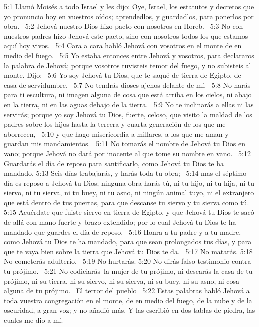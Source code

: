 5:1 Llamó Moisés a todo Israel y les dijo: Oye, Israel, los estatutos y decretos que yo pronuncio hoy en vuestros oídos; aprendedlos, y guardadlos, para ponerlos por obra.  
5:2 Jehová nuestro Dios hizo pacto con nosotros en Horeb.  
5:3 No con nuestros padres hizo Jehová este pacto, sino con nosotros todos los que estamos aquí hoy vivos.  
5:4 Cara a cara habló Jehová con vosotros en el monte de en medio del fuego.  
5:5 Yo estaba entonces entre Jehová y vosotros, para declararos la palabra de Jehová; porque vosotros tuvisteis temor del fuego, y no subisteis al monte. Dijo:  
5:6 Yo soy Jehová tu Dios, que te saqué de tierra de Egipto, de casa de servidumbre.  
5:7 No tendrás dioses ajenos delante de mí.  
5:8 No harás para ti escultura, ni imagen alguna de cosa que está arriba en los cielos, ni abajo en la tierra, ni en las aguas debajo de la tierra.  
5:9 No te inclinarás a ellas ni las servirás; porque yo soy Jehová tu Dios, fuerte, celoso, que visito la maldad de los padres sobre los hijos hasta la tercera y cuarta generación de los que me aborrecen,  
5:10 y que hago misericordia a millares, a los que me aman y guardan mis mandamientos.  
5:11 No tomarás el nombre de Jehová tu Dios en vano; porque Jehová no dará por inocente al que tome su nombre en vano.  
5:12 Guardarás el día de reposo para santificarlo, como Jehová tu Dios te ha mandado. 
5:13 Seis días trabajarás, y harás toda tu obra;  
5:14 mas el séptimo día es reposo a Jehová tu Dios; ninguna obra harás tú, ni tu hijo, ni tu hija, ni tu siervo, ni tu sierva, ni tu buey, ni tu asno, ni ningún animal tuyo, ni el extranjero que está dentro de tus puertas, para que descanse tu siervo y tu sierva como tú.  
5:15 Acuérdate que fuiste siervo en tierra de Egipto, y que Jehová tu Dios te sacó de allá con mano fuerte y brazo extendido; por lo cual Jehová tu Dios te ha mandado que guardes el día de reposo.  
5:16 Honra a tu padre y a tu madre, como Jehová tu Dios te ha mandado, para que sean prolongados tus días, y para que te vaya bien sobre la tierra que Jehová tu Dios te da.  
5:17 No matarás. 
5:18 No cometerás adulterio.  
5:19 No hurtarás. 
5:20 No dirás falso testimonio contra tu prójimo.  
5:21 No codiciarás la mujer de tu prójimo, ni desearás la casa de tu prójimo, ni su tierra, ni su siervo, ni su sierva, ni su buey, ni su asno, ni cosa alguna de tu prójimo.  
El terror del pueblo   
5:22 Estas palabras habló Jehová a toda vuestra congregación en el monte, de en medio del fuego, de la nube y de la oscuridad, a gran voz; y no añadió más. Y las escribió en dos tablas de piedra, las cuales me dio a mí.  
